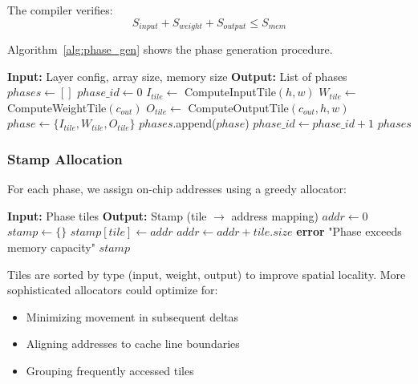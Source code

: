 \documentclass[conference]{IEEEtran}
\begin{document}
The compiler verifies:
\begin{equation}
S_{input} + S_{weight} + S_{output} \leq S_{mem}
\end{equation}

Algorithm~\ref{alg:phase_gen} shows the phase generation procedure.

\begin{algorithm}[t]
\caption{Phase Generation}
\label{alg:phase_gen}
\begin{algorithmic}[1]
\STATE \textbf{Input:} Layer config, array size, memory size
\STATE \textbf{Output:} List of phases
\STATE $phases \gets []$
\STATE $phase\_id \gets 0$
      \STATE $I_{tile} \gets $ ComputeInputTile$(h, w)$
      \STATE $W_{tile} \gets $ ComputeWeightTile$(c_{out})$
      \STATE $O_{tile} \gets $ ComputeOutputTile$(c_{out}, h, w)$
      \STATE $phase \gets \{I_{tile}, W_{tile}, O_{tile}\}$
      \STATE $phases$.append($phase$)
      \STATE $phase\_id \gets phase\_id + 1$
    \ENDFOR
  \ENDFOR
\ENDFOR
\RETURN $phases$
\end{algorithmic}
\end{algorithm}

\subsubsection{Stamp Allocation}

For each phase, we assign on-chip addresses using a greedy allocator:

\begin{algorithm}[t]
\caption{Greedy Stamp Allocation}
\label{alg:stamp_alloc}
\begin{algorithmic}[1]
\STATE \textbf{Input:} Phase tiles
\STATE \textbf{Output:} Stamp (tile $\to$ address mapping)
\STATE $addr \gets 0$
\STATE $stamp \gets \{\}$
  \STATE $stamp[tile] \gets addr$
  \STATE $addr \gets addr + tile.size$
    \STATE \textbf{error} "Phase exceeds memory capacity"
  \ENDIF
\ENDFOR
\RETURN $stamp$
\end{algorithmic}
\end{algorithm}

Tiles are sorted by type (input, weight, output) to improve spatial locality. More sophisticated allocators could optimize for:
\begin{itemize}
\item Minimizing movement in subsequent deltas
\item Aligning addresses to cache line boundaries
\item Grouping frequently accessed tiles
\end{itemize}
\end{document}
